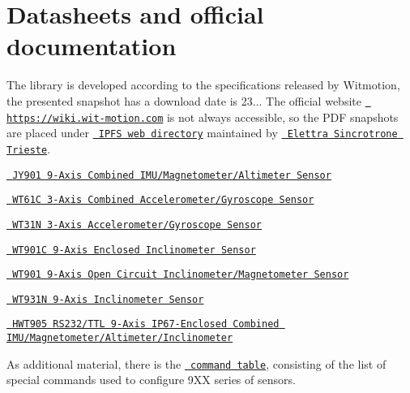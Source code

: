 \chapter{Datasheets and official documentation}
\hypertarget{witmotion_docs}{}\label{witmotion_docs}
The library is developed according to the specifications released by Witmotion, the presented snapshot has a download date is 23... The official website \href{https://wiki.wit-motion.com}{\texttt{ https\+://wiki.\+wit-\/motion.\+com}} is not always accessible, so the PDF snapshots are placed under \href{https://ipfs.elettra.eu/ipfs/QmcCrrDzapJHXe5NdbNSRBgZvu2DD8ZVrndKBVAUY4wPL7}{\texttt{ IPFS web directory}} maintained by \href{https://elettra.eu}{\texttt{ Elettra Sincrotrone Trieste}}.
\begin{DoxyItemize}
\item \href{https://ipfs.elettra.eu/ipfs/QmQZpNbeAdFcg3kDyjyeXBRpPW3McUyCzeR2fbV3Uqyo9Z/Witmotion\%20JY901\%20Datasheet.pdf}{\texttt{ JY901 9-\/Axis Combined IMU/\+Magnetometer/\+Altimeter Sensor}}
\item \href{https://ipfs.elettra.eu/ipfs/QmQZpNbeAdFcg3kDyjyeXBRpPW3McUyCzeR2fbV3Uqyo9Z/Witmotion\%20WT61C\%20Datasheet.pdf}{\texttt{ WT61C 3-\/Axis Combined Accelerometer/\+Gyroscope Sensor}}
\item \href{https://ipfs.elettra.eu/ipfs/QmQZpNbeAdFcg3kDyjyeXBRpPW3McUyCzeR2fbV3Uqyo9Z/Witmotion\%20WT31N\%20Datasheet.pdf}{\texttt{ WT31N 3-\/Axis Accelerometer/\+Gyroscope Sensor}}
\item \href{https://ipfs.elettra.eu/ipfs/QmQZpNbeAdFcg3kDyjyeXBRpPW3McUyCzeR2fbV3Uqyo9Z/Witmotion\%20WT901C\%20Datasheet.pdf}{\texttt{ WT901C 9-\/Axis Enclosed Inclinometer Sensor}}
\item \href{https://ipfs.elettra.eu/ipfs/QmQZpNbeAdFcg3kDyjyeXBRpPW3McUyCzeR2fbV3Uqyo9Z/Witmotion\%20WT901\%20Datasheet.pdf}{\texttt{ WT901 9-\/Axis Open Circuit Inclinometer/\+Magnetometer Sensor}}
\item \href{https://ipfs.elettra.eu/ipfs/QmQZpNbeAdFcg3kDyjyeXBRpPW3McUyCzeR2fbV3Uqyo9Z/Witmotion\%20WT931N\%20Datasheet.pdf}{\texttt{ WT931N 9-\/Axis Inclinometer Sensor}}
\item \href{https://ipfs.elettra.eu/ipfs/QmcCrrDzapJHXe5NdbNSRBgZvu2DD8ZVrndKBVAUY4wPL7/Witmotion\%20HWT905\%20RS232\%20Datasheet.pdf}{\texttt{ HWT905 RS232/\+TTL 9-\/Axis IP67-\/\+Enclosed Combined IMU/\+Magnetometer/\+Altimeter/\+Inclinometer}}
\end{DoxyItemize}

As additional material, there is the \href{https://ipfs.elettra.eu/ipfs/QmQZpNbeAdFcg3kDyjyeXBRpPW3McUyCzeR2fbV3Uqyo9Z/Witmotion\%209-axis\%20IMU\%20special\%20commands.pdf}{\texttt{ command table}}, consisting of the list of special commands used to configure 9XX series of sensors. 